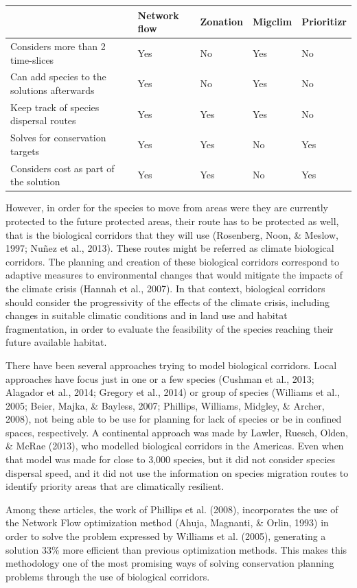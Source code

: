 \documentclass[]{article}
\begin{document}
\begin{table}[H]
\centering
\begin{tabular}{lllll}
\toprule
 & Network flow & Zonation & Migclim & Prioritizr\\
\midrule
Considers more than 2 time-slices & Yes & No & Yes & No\\
Can add species to the solutions afterwards & Yes & No & Yes & No\\
Keep track of species dispersal routes & Yes & Yes & Yes & No\\
Solves for conservation targets & Yes & Yes & No & Yes\\
Considers cost as part of the solution & Yes & Yes & No & Yes\\
\bottomrule
\end{tabular}
\end{table}

However, in order for the species to move from areas were they are currently protected to the future protected areas, their route has to be protected as well, that is the biological corridors that they will use (Rosenberg, Noon, \& Meslow, 1997; Nuñez et al., 2013). These routes might be referred as climate biological corridors. The planning and creation of these biological corridors correspond to adaptive measures to environmental changes that would mitigate the impacts of the climate crisis (Hannah et al., 2007). In that context, biological corridors should consider the progressivity of the effects of the climate crisis, including changes in suitable climatic conditions and in land use and habitat fragmentation, in order to evaluate the feasibility of the species reaching their future available habitat.

There have been several approaches trying to model biological corridors. Local approaches have focus just in one or a few species (Cushman et al., 2013; Alagador et al., 2014; Gregory et al., 2014) or group of species (Williams et al., 2005; Beier, Majka, \& Bayless, 2007; Phillips, Williams, Midgley, \& Archer, 2008), not being able to be use for planning for lack of species or be in confined spaces, respectively. A continental approach was made by Lawler, Ruesch, Olden, \& McRae (2013), who modelled biological corridors in the Americas. Even when that model was made for close to 3,000 species, but it did not consider species dispersal speed, and it did not use the information on species migration routes to identify priority areas that are climatically resilient.

Among these articles, the work of Phillips et al. (2008), incorporates the use of the Network Flow optimization method (Ahuja, Magnanti, \& Orlin, 1993) in order to solve the problem expressed by Williams et al. (2005), generating a solution 33\% more efficient than previous optimization methods. This makes this methodology one of the most promising ways of solving conservation planning problems through the use of biological corridors.
\end{document}
